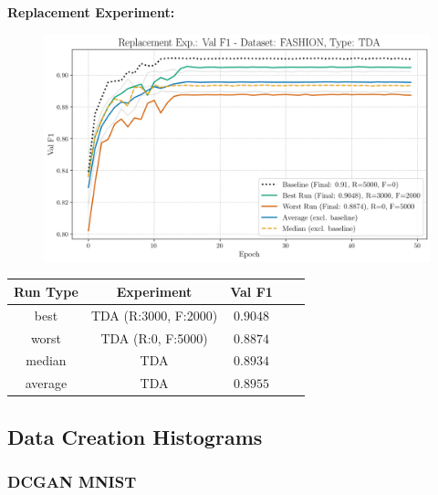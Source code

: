 \noindent\textbf{Replacement Experiment:}
\begin{figure}[htbp]
	\centering
	\includegraphics[width=.85\textwidth]{abb/strat_classifier_performance/tda_fashion_mnist/replacement_experiments/val_f1_score_tda_fashion_mnist_fashion_all.png}
	\label{fig:app_strat_class_performance_replacement_exp._val_f1_score_}
\end{figure}
\begin{table}[H]
	\centering
	\vspace{-1em}
	\begin{tabular}{|c|c|c|c|c|}
		\hline
		Run Type & Experiment & Val F1 \\ \hline
		best & TDA (R:3000, F:2000) & $0.9048$\\ \hline
		worst & TDA (R:0, F:5000) & $0.8874$\\ \hline
		median & TDA & $0.8934$\\ \hline
		average & TDA & $0.8955$
		\\ \hline
	\end{tabular}
\end{table}
\newpage

\subsection{Data Creation Histograms}
\subsubsection{DCGAN MNIST}

